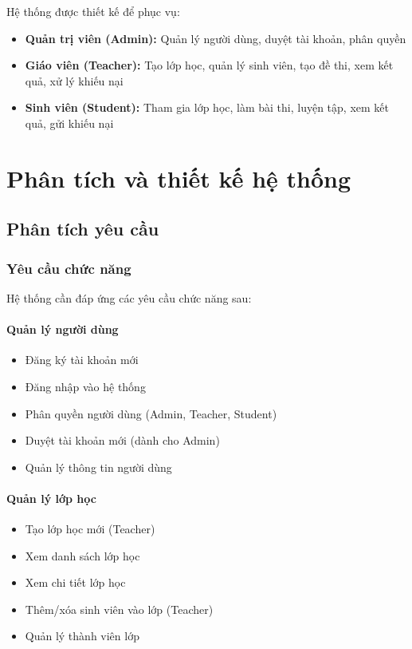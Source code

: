﻿\documentclass[12pt,a4paper]{report}
\begin{document}
Hệ thống được thiết kế để phục vụ:
\begin{itemize}
    \item \textbf{Quản trị viên (Admin):} Quản lý người dùng, duyệt tài khoản, phân quyền
    \item \textbf{Giáo viên (Teacher):} Tạo lớp học, quản lý sinh viên, tạo đề thi, xem kết quả, xử lý khiếu nại
    \item \textbf{Sinh viên (Student):} Tham gia lớp học, làm bài thi, luyện tập, xem kết quả, gửi khiếu nại
\end{itemize}

\chapter{Phân tích và thiết kế hệ thống}

\section{Phân tích yêu cầu}

\subsection{Yêu cầu chức năng}

Hệ thống cần đáp ứng các yêu cầu chức năng sau:

\subsubsection{Quản lý người dùng}
\begin{itemize}
    \item Đăng ký tài khoản mới
    \item Đăng nhập vào hệ thống
    \item Phân quyền người dùng (Admin, Teacher, Student)
    \item Duyệt tài khoản mới (dành cho Admin)
    \item Quản lý thông tin người dùng
\end{itemize}

\subsubsection{Quản lý lớp học}
\begin{itemize}
    \item Tạo lớp học mới (Teacher)
    \item Xem danh sách lớp học
    \item Xem chi tiết lớp học
    \item Thêm/xóa sinh viên vào lớp (Teacher)
    \item Quản lý thành viên lớp
\end{itemize}
\end{document}
